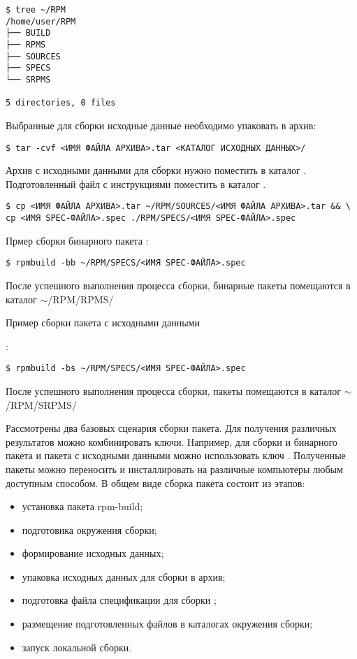 \begin{verbatim}
$ tree ~/RPM
/home/user/RPM
├── BUILD
├── RPMS
├── SOURCES
├── SPECS
└── SRPMS

5 directories, 0 files
\end{verbatim}

Выбранные для сборки исходные данные необходимо упаковать в  архив:

\begin{verbatim}
$ tar -cvf <ИМЯ ФАЙЛА АРХИВА>.tar <КАТАЛОГ ИСХОДНЫХ ДАННЫХ>/
\end{verbatim}

Архив с исходными данными для сборки нужно поместить в каталог .
Подготовленный  файл с инструкциями поместить в каталог .

\begin{verbatim}
$ cp <ИМЯ ФАЙЛА АРХИВА>.tar ~/RPM/SOURCES/<ИМЯ ФАЙЛА АРХИВА>.tar && \
cp <ИМЯ SPEC-ФАЙЛА>.spec ./RPM/SPECS/<ИМЯ SPEC-ФАЙЛА>.spec
\end{verbatim}

Прмер сборки бинарного пакета :
\begin{verbatim}
$ rpmbuild -bb ~/RPM/SPECS/<ИМЯ SPEC-ФАЙЛА>.spec
\end{verbatim}
После успешного выполнения процесса сборки, бинарные пакеты  помещаются в каталог $\sim$/RPM/RPMS/

\hypertarget{rpmbuild-exampl-src}{Пример сборки пакета с исходными данными }:
\begin{verbatim}
$ rpmbuild -bs ~/RPM/SPECS/<ИМЯ SPEC-ФАЙЛА>.spec
\end{verbatim}
После успешного выполнения процесса сборки, пакеты  помещаются в каталог $\sim$/RPM/SRPMS/

Рассмотрены два базовых сценария сборки пакета. Для получения различных результатов можно комбинировать ключи.
Например, для сборки и бинарного пакета и пакета с исходными данными можно использовать ключ \Sys{-ba}.
Полученные пакеты можно переносить и инсталлировать на различные компьютеры любым доступным способом.
В общем виде сборка пакета состоит из этапов:
\begin{itemize}
\item установка пакета rpm-build;
\item подготовика окружения сборки;
\item формирование исходных данных;
\item упаковка исходных данных для сборки в  архив;
\item подготовка файла спецификации для сборки ;
\item размещение подготовленных файлов в каталогах окружения сборки;
\item запуск локальной сборки.
\end{itemize}


